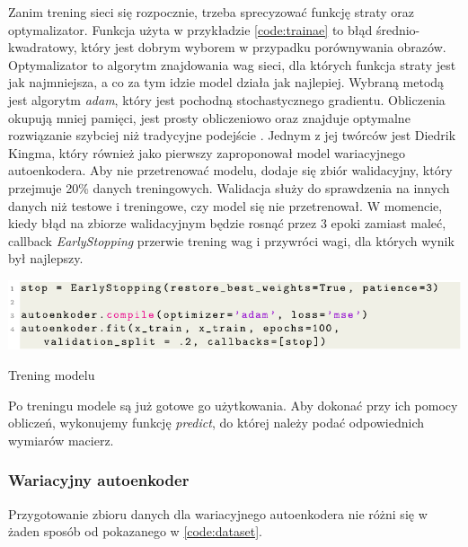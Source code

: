 \documentclass[a4paper,12pt,oneside]{book} %
\begin{document}
Zanim trening sieci się rozpocznie, trzeba sprecyzować funkcję straty oraz optymalizator. Funkcja użyta w przykładzie \ref{code:trainae} to błąd średnio-kwadratowy, który jest dobrym wyborem w przypadku porównywania obrazów. Optymalizator to algorytm znajdowania wag sieci, dla których funkcja straty jest jak najmniejsza, a co za tym idzie model działa jak najlepiej. Wybraną metodą jest algorytm \textit{adam}, który jest pochodną stochastycznego gradientu. Obliczenia okupują mniej pamięci, jest prosty obliczeniowo oraz znajduje optymalne rozwiązanie szybciej niż tradycyjne podejście \cite{adam}. Jednym z jej twórców jest Diedrik Kingma, który również jako pierwszy zaproponował model wariacyjnego autoenkodera. Aby nie przetrenować modelu, dodaje się zbiór walidacyjny, który przejmuje 20\% danych treningowych. Walidacja służy do sprawdzenia na innych danych niż testowe i treningowe, czy model się nie przetrenował. W momencie, kiedy błąd na zbiorze walidacyjnym będzie rosnąć przez 3 epoki zamiast maleć, callback \textit{EarlyStopping} przerwie trening wag i przywróci wagi, dla których wynik był najlepszy.
\begin{code}[h!]
	\centering
	\includegraphics[width=\linewidth]{trainae.pdf}
	\caption{Trening modelu}
	\label{code:trainae}
\end{code}

Po treningu modele są już gotowe go użytkowania. Aby dokonać przy ich pomocy obliczeń, wykonujemy funkcję \textit{predict}, do której należy podać odpowiednich wymiarów macierz. 
\subsubsection{Wariacyjny autoenkoder}
Przygotowanie zbioru danych dla wariacyjnego autoenkodera nie różni się w żaden sposób od pokazanego w \ref{code:dataset}. 
\end{document}
